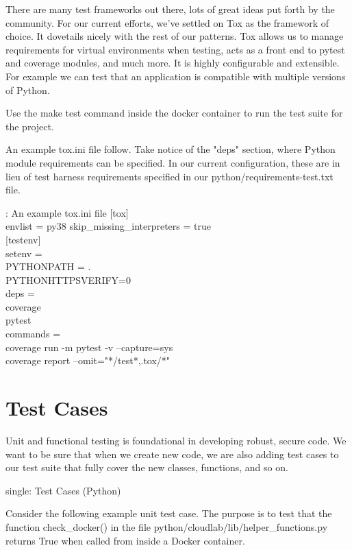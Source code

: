 There are many test frameworks out there, lots of great ideas put forth by the community. For our current efforts, we've settled on Tox as the framework of choice. It dovetails nicely with the rest of our patterns. Tox allows us to manage requirements for virtual environments when testing, acts as a front end to pytest and coverage modules, and much more. It is highly configurable and extensible. For example we can test
that an application is compatible with multiple versions of Python.

\justify
Use the make test command inside the docker container to run the test suite for the project.

\justify
An example tox.ini file follow. Take notice of the "deps" section, where
Python module requirements can be specified. In our current configuration, these are in lieu of test harness requirements specified in our python/requirements-test.txt file.

\begin{mybox}{\thetcbcounter: An example tox.ini file}
[tox]\\
envlist = py38
skip\_missing\_interpreters = true\\

[testenv]\\
setenv =\\
  PYTHONPATH = .\\
  PYTHONHTTPSVERIFY=0\\
deps =\\
  coverage\\
  pytest\\
commands =\\
  coverage run -m pytest -v --capture=sys\\
  coverage report --omit="*/test*,.tox/*"
\end{mybox}

\section{Test Cases}

\justify
Unit and functional testing is foundational in developing robust, secure
code. We want to be sure that when we create new code, we are also
adding test cases to our test suite that fully cover the new classes,
functions, and so on.

single: Test Cases (Python)

\justify
Consider the following example unit test case. The purpose is to test
that the function check\_docker() in the file python/cloudlab/lib/helper\_functions.py returns True when called from inside a Docker container.

